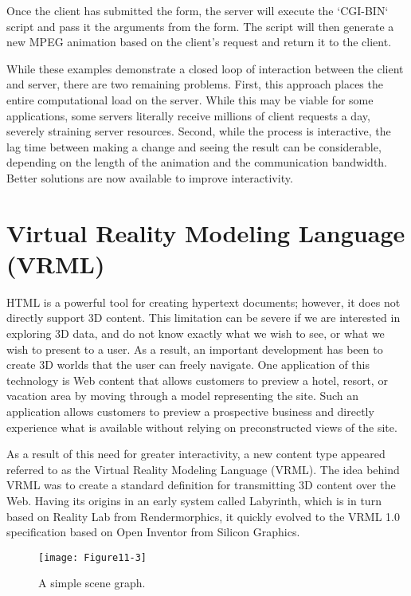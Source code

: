 Once the client has submitted the form, the server will execute the `CGI-BIN` script and pass it the arguments from the form. The script will then generate a new MPEG animation based on the client’s request and return it to the client.

While these examples demonstrate a closed loop of interaction between the client and server, there are two remaining problems. First, this approach places the entire computational load on the server. While this may be viable for some applications, some servers literally receive millions of client requests a day, severely straining server resources. Second, while the process is interactive, the lag time between making a change and seeing the result can be considerable, depending on the length of the animation and the communication bandwidth. Better solutions are now available to improve interactivity.

\section{Virtual Reality Modeling Language (VRML)}

HTML is a powerful tool for creating hypertext documents; however, it does not directly support 3D content. This limitation can be severe if we are interested in exploring 3D data, and do not know exactly what we wish to see, or what we wish to present to a user. As a result, an important development has been to create 3D worlds that the user can freely navigate. One application of this technology is Web content that allows customers to preview a hotel, resort, or vacation area by moving through a model representing the site. Such an application allows customers to preview a prospective business and directly experience what is available without relying on preconstructed views of the site.

As a result of this need for greater interactivity, a new content type appeared referred to as the Virtual Reality Modeling Language (VRML). The idea behind VRML was to create a standard definition for transmitting 3D content over the Web. Having its origins in an early system called Labyrinth, which is in turn based on Reality Lab from Rendermorphics, it quickly evolved to the VRML 1.0 specification based on Open Inventor from Silicon Graphics.

\begin{figure}[!htb]
	\centering
	\texttt{[image: Figure11-3]}
	\caption{A simple scene graph.}
	\label{fig:Figure11-3}
\end{figure}

